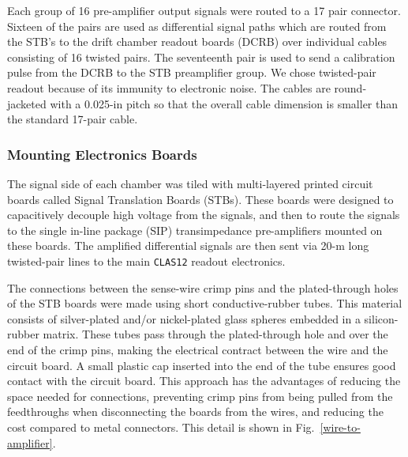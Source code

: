  
Each group of 16 pre-amplifier output signals were routed to a 17 pair connector.
Sixteen of the pairs are used as differential signal paths which are routed from the STB's to the 
drift chamber readout boards (DCRB) over individual cables consisting of 16 twisted pairs.  
The seventeenth pair is used to send a calibration pulse from the DCRB
to the STB preamplifier group. We chose
twisted-pair readout because of its immunity to electronic noise.
The cables are round-jacketed with a 
0.025-in pitch so that the overall cable dimension is smaller than the 
standard 17-pair cable.  

\subsubsection{Mounting Electronics Boards}

The signal side of each chamber was tiled with multi-layered printed circuit 
boards called Signal Translation Boards (STBs).  These boards were designed 
to capacitively decouple high voltage from the signals, and then to route 
the signals to the single in-line package (SIP) transimpedance pre-amplifiers 
mounted on these boards.  The amplified differential signals are then sent 
via 20-m long twisted-pair lines to the main {\tt CLAS12} readout electronics.

The connections between the sense-wire crimp pins and the plated-through holes 
of the STB boards were made using short conductive-rubber tubes.  This material 
consists of silver-plated and/or nickel-plated glass spheres embedded in a 
silicon-rubber matrix.  These tubes pass through the plated-through hole and 
over the end of the crimp pins, making the electrical contract between the 
wire and the circuit board.  A small plastic cap inserted into the end of the 
tube ensures good contact with the circuit board.  This approach has the 
advantages of reducing the space needed for connections, preventing crimp pins 
from being pulled from the feedthroughs when disconnecting the boards from the 
wires, and reducing the cost compared to metal connectors.  This detail is 
shown in Fig.~\ref{wire-to-amplifier}.

